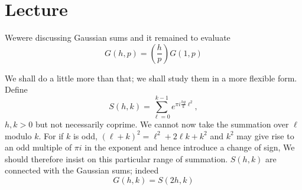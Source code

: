 \chapter{Lecture}\label{part4:lec36} %

We\pageoriginale were discussing Gaussian sums and it remained to
evaluate
$$
G(h, p) = \left(\frac{h}{p}\right) G(1, p)
$$

We shall do a little more than that; we shall study them in a more
flexible form. Define
$$
S(h, k) = \sum^{k-1}_{\ell =0} e^{\pi i \frac{hg}{k} \ell^2},
$$
$h, k> 0$ but not necessarily coprime. We cannot now take the
summation over $\ell $ modulo $k$. For if $k$ is odd, $(\ell +k)^2=
\ell^2 + 2 \ell k+ k^2$ and $k^2$ may give rise to an odd multiple of
$\pi i$ in the exponent and hence introduce a change of sign, We
should therefore insist on this particular range of summation. $S (h,
k)$ are connected with the Gaussian sums; indeed
$$
G(h, k)= S(2h, k)
$$


